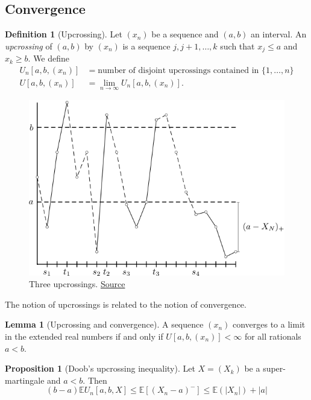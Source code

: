 \documentclass[parskip=full]{article}
\theoremstyle{definition}
\newtheorem*{definition}{Definition}
\newtheorem{proposition}{Proposition}[section]
\newtheorem{lemma}{Lemma}[proposition]
\newcommand{\1}{\mathbbm{1}}
\newcommand{\E}{\mathbb{E}}
\begin{document}
\subsection{Convergence}
\begin{definition}[Upcrossing]
  Let $(x_n)$ be a sequence and $(a, b)$ an interval. An \emph{upcrossing} of $(a, b)$ by $(x_n)$ is a sequence $j, j + 1, \ldots, k$ such that $x_j \leq a$ and $x_k \geq b$. We define\index{$U[a, b, (x_n)$}
  \begin{align*}
    U_n[a, b, (x_n)] & = \text{number of disjoint upcrossings contained in }\{1, \ldots, n\} \\
    U[a, b, (x_n)]   & = \lim_{n \to \infty} U_n[a, b, (x_n)].
  \end{align*}
\end{definition}

\begin{figure}[h]
  \centering
  \includegraphics*{upcrossings.png}
  \caption{Three upcrossings. \href{https://almostsuremath.com/2009/12/06/upcrossings-downcrossings-and-martingale-convergence/}{Source}}
\end{figure}

The notion of upcrossings is related to the notion of convergence.

\begin{lemma}[Upcrossing and convergence] \label{upcrossing and convergence}
  A sequence $(x_n)$ converges to a limit in the extended real numbers if and only if $U[a, b, (x_n)] < \infty$ for all rationals $a < b$.
\end{lemma}

\begin{proposition}[Doob's upcrossing inequality]
  Let $X=(X_k)$ be a super-martingale and $a < b$. Then
  \[
    (b - a) \E U_n[a, b, X] \leq \E[(X_n - a)^-] \leq \E(|X_n|) + |a|
  \]
\end{proposition}
\end{document}
